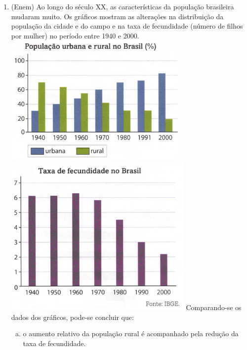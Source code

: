 \documentclass[a4paper,14pt]{article}
\begin{document}
\begin{multicols}{2}
\begin{enumerate}
			\item (Enem) Ao longo do século XX, as características da população brasileira mudaram muito. Os gráficos mostram as alterações na distribuição da população da cidade e do campo e na taxa de fecundidade (número de filhos por mulher) no período entre 1940 e 2000.
			\\
			\includegraphics[width=1\linewidth]{6FMA119_imagens/imagem13}
			\\
			\includegraphics[width=1\linewidth]{6FMA119_imagens/imagem14}
			Comparando-se os dados dos gráficos, pode-se concluir que:
			\begin{enumerate}[a)]
				\item o aumento relativo da população rural é acompanhado pela redução da taxa de fecundidade.

\end{enumerate}
\end{enumerate}
\end{multicols}
\end{document}
